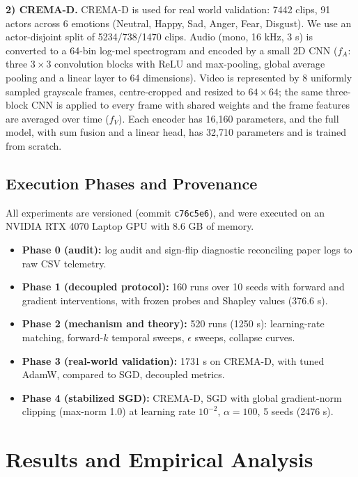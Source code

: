 \documentclass[conference]{IEEEtran}
\begin{document}
\textbf{2) CREMA-D.} CREMA-D \cite{cao2014crema} is used for real world validation: 7442 clips, 91 actors across 6 emotions (Neutral, Happy, Sad, Anger, Fear, Disgust). We use an actor-disjoint split of 5234/738/1470 clips. Audio (mono, 16 kHz, 3 s) is converted to a 64-bin log-mel spectrogram and encoded by a small 2D CNN ($f_A$: three $3\times3$ convolution blocks with ReLU and max-pooling, global average pooling and a linear layer to 64 dimensions). Video is represented by 8 uniformly sampled grayscale frames, centre-cropped and resized to $64\times64$; the same three-block CNN is applied to every frame with shared weights and the frame features are averaged over time ($f_V$). Each encoder has 16,160 parameters, and the full model, with sum fusion and a linear head, has 32,710 parameters and is trained from scratch.

\subsection{Execution Phases and Provenance}
All experiments are versioned (commit \texttt{c76c5e6}), and were executed on an NVIDIA RTX 4070 Laptop GPU with 8.6 GB of memory.
\begin{itemize}
    \item \textbf{Phase 0 (audit):} log audit and sign-flip diagnostic reconciling paper logs to raw CSV telemetry.
    \item \textbf{Phase 1 (decoupled protocol):} 160 runs over 10 seeds with forward and gradient interventions, with frozen probes and Shapley values (376.6 s).
    \item \textbf{Phase 2 (mechanism and theory):} 520 runs (1250 s): learning-rate matching, forward-$k$ temporal sweeps, $\epsilon$ sweeps, collapse curves.
    \item \textbf{Phase 3 (real-world validation):} 1731 s on CREMA-D, with tuned AdamW, compared to SGD, decoupled metrics.
    \item \textbf{Phase 4 (stabilized SGD):} CREMA-D, SGD with global gradient-norm clipping (max-norm 1.0) at learning rate $10^{-2}$, $\alpha = 100$, 5 seeds (2476 s).
\end{itemize}

\section{Results and Empirical Analysis}
\end{document}
